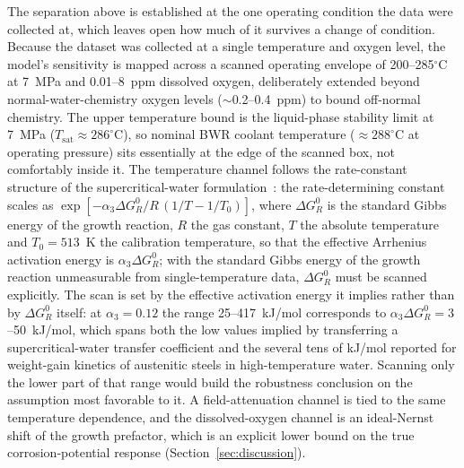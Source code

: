 \documentclass[pdflatex,sn-nature]{sn-jnl}
\begin{document}
The separation above is established at the one operating condition the
data were collected at, which leaves open how much of it survives a
change of condition. Because the dataset was collected at a single
temperature and oxygen level, the model's sensitivity is mapped across a
scanned operating envelope of 200--285$^\circ$C at 7~MPa and 0.01--8~ppm
dissolved oxygen, deliberately extended beyond normal-water-chemistry
oxygen levels ($\sim$0.2--0.4~ppm) to bound off-normal chemistry. The
upper temperature bound is the liquid-phase stability limit at 7~MPa
($T_\text{sat} \approx 286^\circ$C), so nominal BWR coolant temperature
($\approx 288^\circ$C at operating pressure) sits essentially at the
edge of the scanned box, not comfortably inside it. The temperature
channel follows the rate-constant structure of the supercritical-water
formulation~\citep{li2020scwpdm}: the rate-determining constant scales
as $\exp[-\alpha_3 \Delta G^0_R/R\,(1/T - 1/T_0)]$, where $\Delta G^0_R$
is the standard Gibbs energy of the growth reaction, $R$ the gas
constant, $T$ the absolute temperature and $T_0 = 513$~K the calibration
temperature, so that the effective Arrhenius activation energy is
$\alpha_3 \Delta G^0_R$; with the standard Gibbs energy of the growth
reaction unmeasurable from single-temperature data, $\Delta G^0_R$ must
be scanned explicitly. The scan is set by the effective activation
energy it implies rather than by $\Delta G^0_R$ itself: at $\alpha_3 =
0.12$ the range 25--417~kJ/mol corresponds to $\alpha_3 \Delta G^0_R =
3$--50~kJ/mol, which spans both the low values implied by transferring a
supercritical-water transfer coefficient and the several tens of kJ/mol
reported for weight-gain kinetics of austenitic steels in
high-temperature water. Scanning only the lower part of that range would
build the robustness conclusion on the assumption most favorable to it.
A field-attenuation channel is tied to the same temperature dependence,
and the dissolved-oxygen channel is an ideal-Nernst shift of the growth
prefactor, which is an explicit lower bound on the true
corrosion-potential response (Section~\ref{sec:discussion}).
\end{document}
